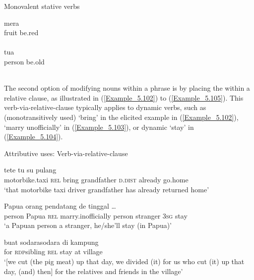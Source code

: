 \vspace{10 pt} {Monovalent stative verbs} \vspace{0 pt}\\
\ex
\label{Example_5.101g}

  {mera} \\   
   fruit  be.red     \\
    \\
\vspace{5pt}
\ex
\label{Example_5.101h}
  {tua}\\
 person  be.old\\
 \\
 \z
 \z


The second option of modifying nouns within a  phrase is by placing the  within a relative clause, as illustrated in (\ref{Example_5.102}) to (\ref{Example_5.105}). This verb-via-relative-clause  typically applies to dynamic verbs, such as (monotransitively used)   ‘bring’ in the elicited example in (\ref{Example_5.102}),   ‘marry unofficially’ in (\ref{Example_5.103}), or  dynamic  ‘stay’ in (\ref{Example_5.104}).


\begin{styleExampleTitle}
Attributive uses: Verb-via-relative-clause 
\end{styleExampleTitle}

\ea
\label{Example_5.102}
 {} {} {tete} {tu} {su} {pulang}\\ %
 motorbike.taxi  \textsc{rel}  bring  grandfather  \textsc{d.dist}  already  go.home\\
\glt 
‘that motorbike taxi driver  grandfather has already returned home’ \textstyleExampleSource{[Elicited MY131119.001]}
\z

\ea
\label{Example_5.103}
 {Papua} {} {} {orang} {pendatang} {de} {tinggal} {{\ldots}}\\ %
 person  Papua  \textsc{rel}  marry.inofficially  person  stranger  \textsc{3sg}  stay  \\
\glt 
‘a Papuan person  a stranger, he/she’ll stay (in Papua)’ \textstyleExampleSource{[081029-005-Cv.0046]}
\z

\ea
\label{Example_5.104}
\gll {{\ldots}} {buat} {sodara{\Tilde}sodara} {} {} {di} {kampung}\\ %
  { } for  \textsc{rdp}{\Tilde}sibling  \textsc{rel}  stay  at  village\\
\glt 
‘[we cut (the pig meat) up that day, we divided (it) for us who cut (it) up that day, (and) then] for the relatives and friends  in the village’ \textstyleExampleSource{[080919-003-NP.0014]}
\z

